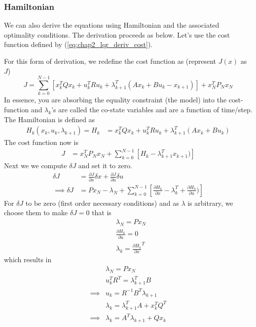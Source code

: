 \subsubsection{Hamiltonian}
We can also derive the equations using Hamiltonian and the associated optimality conditions. The derivation proceeds as below.
Let's use the cost function defined by (\ref{eq:chap2_lqr_deriv_cost}).

For this form of derivation, we redefine the cost function as (represent $J(x)$ as $J$)
\begin{dmath*}
    J = \sum_{k=0}^{N-1}\left[x_k^TQx_k + u_k^TRu_k + \lambda_{k+1}^T (Ax_k+Bu_k - x_{k+1})\right] + x^T_NP_Nx_N
\end{dmath*}
In essence, you are absorbing the equality constraint (the model) into the cost-function and $\lambda_k$'s are called the co-state variables and are a function of time/step.
The Hamiltonian is defined as
\begin{align}
    H_k(x_k, u_k, \lambda_{k+1}) = H_k &= x_k^TQx_k + u_k^TRu_k + \lambda_{k+1}^T (Ax_k+Bu_k)
\end{align}
The cost function now is
\begin{align}
    J &= x^T_NP_Nx_N +  \sum_{k=0}^{N-1}\left[H_k - \lambda_{k+1}^Tx_{k+1})\right]
\end{align}
Next we we compute $\delta J$ and set it to zero.
\begin{align}
    \delta J &= \frac{\partial{J}}{\partial x} \delta x + \frac{\partial{J}}{\partial u} \delta u \\
    \implies \delta J &= Px_N - \lambda_N + \sum_{k=0}^{N-1}\left[\frac{\partial{H_k}}{\partial x} - \lambda_{k}^T + \frac{\partial{H_k}}{\partial u})\right]
\end{align}
For $\delta J$ to be zero (first order necessary conditions) and as $\lambda$ is arbitrary, we choose them to make $\delta J = 0$ that is
\begin{align}
    & \lambda_N = Px_N \\
    & \frac{\partial{H_k}}{\partial u} = 0 \\
    & \lambda_{k} = {\frac{\partial{H_k}}{\partial x}}^T
\end{align}
which results in 
\begin{align}
    & \lambda_N = Px_N \\
    & u_k^TR^T = \lambda_{k+1}^TB\\
    \implies &u_k = R^{-1}B^T\lambda_{k+1} \\
    & \lambda_{k} = \lambda_{k+1}^TA + x_k^TQ^T \\
    \implies &\lambda_{k} = A^T\lambda_{k+1} + Qx_k
\end{align}

